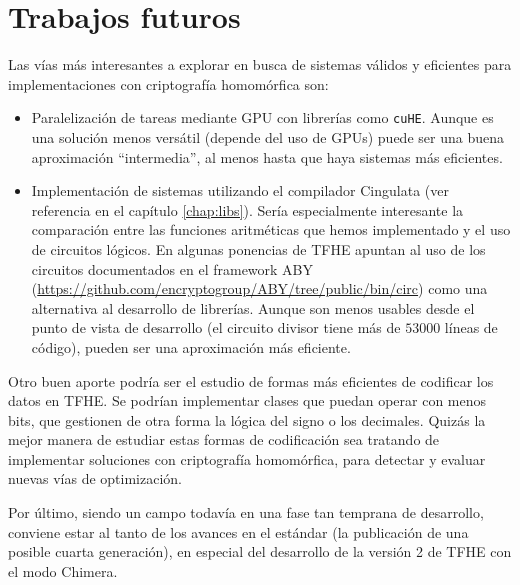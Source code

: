 \chapter{Trabajos futuros}
\label{chap:trabajos_futuros}

Las vías más interesantes a explorar en busca de sistemas válidos y eficientes para implementaciones con criptografía homomórfica son:

\begin{itemize}
    \item Paralelización de tareas mediante GPU con librerías como \verb|cuHE|. Aunque es una solución menos versátil (depende del uso de GPUs) puede ser una buena aproximación ``intermedia'', al menos hasta que haya sistemas más eficientes. 
    \item Implementación de sistemas utilizando el compilador Cingulata (ver referencia en el capítulo \ref{chap:libs}). Sería especialmente interesante la comparación entre las funciones aritméticas que hemos implementado y el uso de circuitos lógicos. En algunas ponencias de TFHE apuntan al uso de los circuitos documentados en el framework ABY (\url{https://github.com/encryptogroup/ABY/tree/public/bin/circ}) como una alternativa al desarrollo de librerías. Aunque son menos usables desde el punto de vista de desarrollo (el circuito divisor tiene más de $53000$ líneas de código), pueden ser una aproximación más eficiente.
\end{itemize}

Otro buen aporte podría ser el estudio de formas más eficientes de codificar los datos en TFHE. Se podrían implementar clases que puedan operar con menos bits, que gestionen de otra forma la lógica del signo o los decimales. Quizás la mejor manera de estudiar estas formas de codificación sea tratando de implementar soluciones con criptografía homomórfica, para detectar y evaluar nuevas vías de optimización.

Por último, siendo un campo todavía en una fase tan temprana de desarrollo, conviene estar al tanto de los avances en el estándar (la publicación de una posible cuarta generación), en especial del desarrollo de la versión 2 de TFHE con el modo Chimera.
